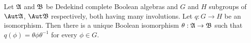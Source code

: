      
Let $\frak A$ and $\frak B$ be Dedekind
complete Boolean algebras and $G$ and $H$ subgroups of $\Aut\frak A$,
$\Aut\frak B$ respectively, both having many involutions.    Let
$q:G\to H$ be an isomorphism.   Then there is a unique
Boolean isomorphism $\theta:\frak A\to\frak B$ such that
$q(\phi)=\theta\phi\theta^{-1}$ for every $\phi\in G$.
     
